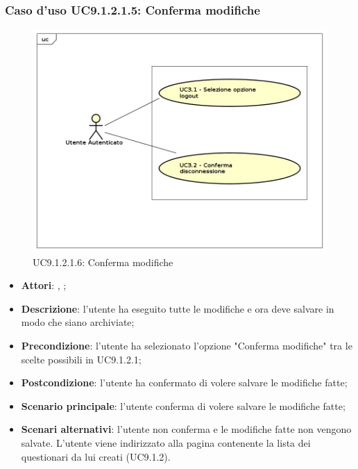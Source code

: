 					\subsubsection{Caso d'uso UC9.1.2.1.5: Conferma modifiche}
					\label{UC9.1.2.1.6}
					\begin{figure}[h]
						\centering
					\includegraphics[scale=0.5,keepaspectratio]{UML/UC9.png}
						\caption{UC9.1.2.1.6: Conferma modifiche}
					\end{figure}
					\FloatBarrier
					\begin{itemize}
						\item \textbf{Attori}: \uau, \uaupro;
						\item \textbf{Descrizione}: l'utente ha eseguito tutte le modifiche e ora deve salvare in modo che siano archiviate;
						\item \textbf{Precondizione}: l'utente ha selezionato l'opzione "Conferma modifiche" tra le scelte possibili in UC9.1.2.1;
						\item \textbf{Postcondizione}: l'utente ha confermato di volere salvare le modifiche fatte;
						\item \textbf{Scenario principale}: l'utente conferma di volere salvare le modifiche fatte;
						\item \textbf{Scenari alternativi}: l'utente non conferma e le modifiche fatte non vengono salvate. L'utente viene indirizzato alla pagina contenente la lista dei questionari da lui creati (UC9.1.2).
					\end{itemize}
										
